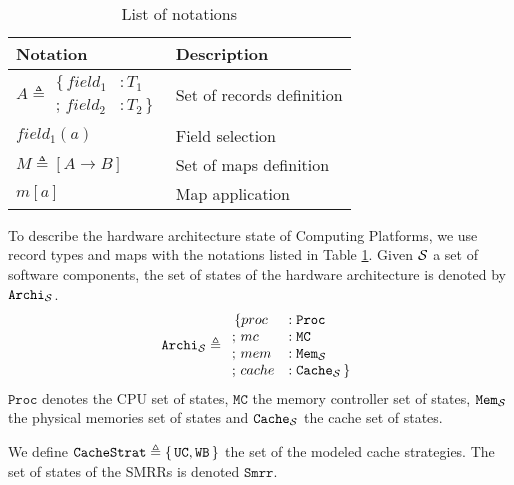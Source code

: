 \begin{table}
\begin{center}
  \begin{tabular}{ll}
    \hline
    \bf{Notation} & \bf{Description} \\
    \hline
    $ A \triangleq \begin{array}{ll}
                      \{\,field_1 &: T_1 \\
                      ;\,field_2 &: T_2\,\}
                    \end{array} $ & Set of records definition \\
    \hline
    $field_1(a)$ & Field selection \\
    \hline
    $M \triangleq [A \rightarrow B]$ & Set of maps definition \\
    \hline
    $m[a]$ & Map application \\
    \hline
  \end{tabular}
  \caption{List of notations}
  \label{tab:notation}
\end{center}
\end{table}

To describe the hardware architecture state of  Computing
Platforms, we use record types and maps with the notations listed in Table
\ref{tab:notation}.  Given $\mathcal{S}$ a set of software components, the set of
states of the hardware architecture is denoted by $\texttt{Archi}_{\mathcal{S}}$.
\[ \texttt{Archi}_{\mathcal{S}} \triangleq
  \begin{array}{ll}
    \,\{proc &: \texttt{Proc}          \\
    ;\,mc    &: \texttt{MC}            \\
    ;\,mem   &: \texttt{Mem}_{\mathcal{S}} \\
    ;\,cache &: \texttt{Cache}_{\mathcal{S}}\,\}
  \end{array}
\]
$\texttt{Proc}$ denotes the CPU set of states, $\texttt{MC}$ the memory
controller set of states, $\texttt{Mem}_{\mathcal{S}}$ the physical memories set of
states and $\texttt{Cache}_{\mathcal{S}}$ the cache set of states.

We define $\texttt{CacheStrat} \triangleq \{\,\mathtt{UC}, \mathtt{WB}\,\}$ the
set of the modeled cache strategies. The set of states of the SMRRs is denoted
$\texttt{Smrr}$.


